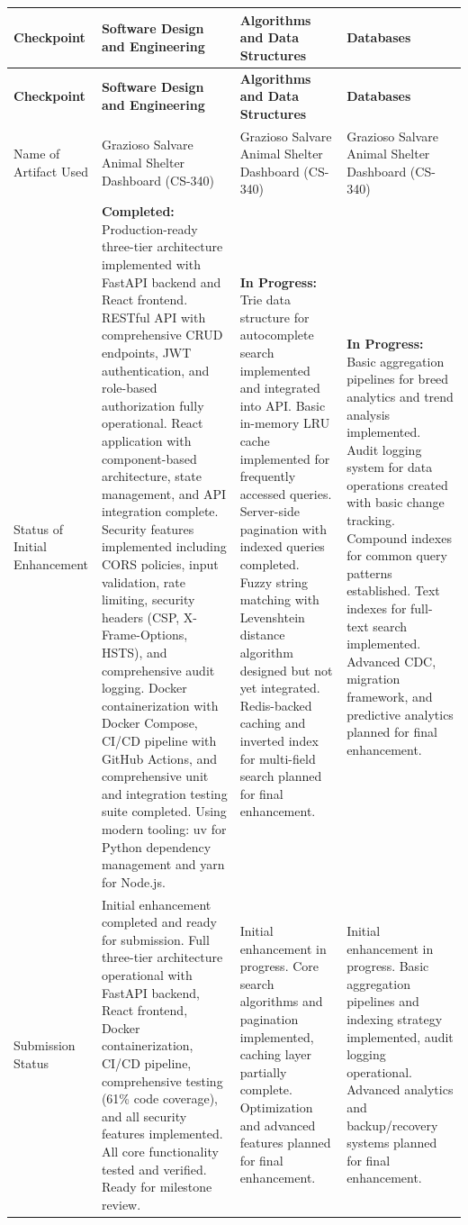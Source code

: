 \documentclass[12pt,stu]{apa7}
\begin{document}
\begingroup
\footnotesize
\setlength{\tabcolsep}{5pt}
\begin{longtable}{@{}L{2.5cm}L{4.8cm}L{4.8cm}L{4.8cm}@{}}
\toprule
\textbf{Checkpoint} & \textbf{Software Design and Engineering} & \textbf{Algorithms and Data Structures} & \textbf{Databases} \\
\midrule
\endfirsthead
\toprule
\textbf{Checkpoint} & \textbf{Software Design and Engineering} & \textbf{Algorithms and Data Structures} & \textbf{Databases} \\
\midrule
\endhead
\bottomrule
\endfoot
\bottomrule
\endlastfoot
Name of Artifact Used & Grazioso Salvare Animal Shelter Dashboard (CS-340) & Grazioso Salvare Animal Shelter Dashboard (CS-340) & Grazioso Salvare Animal Shelter Dashboard (CS-340) \\
\midrule
Status of Initial Enhancement & \textbf{Completed:} Production-ready three-tier architecture implemented with FastAPI backend and React frontend. RESTful API with comprehensive CRUD endpoints, JWT authentication, and role-based authorization fully operational. React application with component-based architecture, state management, and API integration complete. Security features implemented including CORS policies, input validation, rate limiting, security headers (CSP, X-Frame-Options, HSTS), and comprehensive audit logging. Docker containerization with Docker Compose, CI/CD pipeline with GitHub Actions, and comprehensive unit and integration testing suite completed. Using modern tooling: uv for Python dependency management and yarn for Node.js. & \textbf{In Progress:} Trie data structure for autocomplete search implemented and integrated into API. Basic in-memory LRU cache implemented for frequently accessed queries. Server-side pagination with indexed queries completed. Fuzzy string matching with Levenshtein distance algorithm designed but not yet integrated. Redis-backed caching and inverted index for multi-field search planned for final enhancement. & \textbf{In Progress:} Basic aggregation pipelines for breed analytics and trend analysis implemented. Audit logging system for data operations created with basic change tracking. Compound indexes for common query patterns established. Text indexes for full-text search implemented. Advanced CDC, migration framework, and predictive analytics planned for final enhancement. \\
\midrule
Submission Status & Initial enhancement completed and ready for submission. Full three-tier architecture operational with FastAPI backend, React frontend, Docker containerization, CI/CD pipeline, comprehensive testing (61\% code coverage), and all security features implemented. All core functionality tested and verified. Ready for milestone review. & Initial enhancement in progress. Core search algorithms and pagination implemented, caching layer partially complete. Optimization and advanced features planned for final enhancement. & Initial enhancement in progress. Basic aggregation pipelines and indexing strategy implemented, audit logging operational. Advanced analytics and backup/recovery systems planned for final enhancement. \\

\end{longtable}
\end{document}
